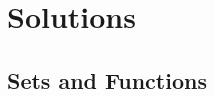 \documentclass[addpoints]{exam}
\begin{document}


\pagebreak

\section{\Huge Solutions}
\subsection{\huge Sets and Functions}

	
	
\end{document}
